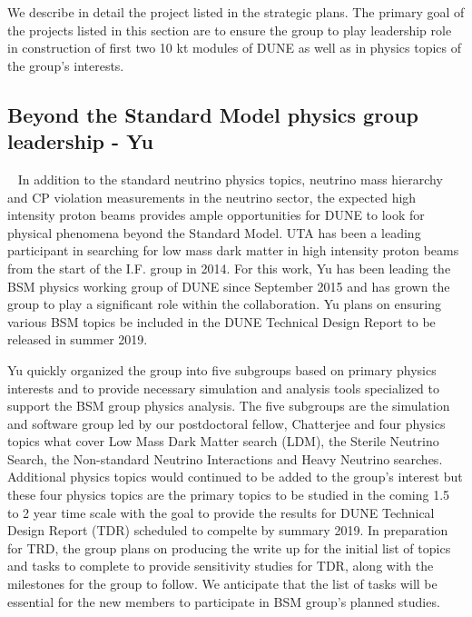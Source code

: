 \label{sec:IF_protoDUNE}
We describe in detail the project listed in the strategic plans.   The primary goal of the projects listed in this section are to ensure
the group to play leadership role in construction of first two 10 kt modules of DUNE as well as in physics topics of the group's 
interests.  
%
%
\subsection {Beyond the Standard Model physics group leadership - Yu}~\label{section:dune-bsm}
In addition to the standard neutrino physics topics, neutrino mass hierarchy and CP violation measurements in the neutrino sector, the 
expected high intensity proton beams provides ample opportunities for DUNE to look for physical phenomena beyond the Standard Model. UTA has been a leading participant in searching for low mass dark matter in high intensity proton beams from the start of the I.F. group in 2014. For this work, Yu has been leading the BSM physics working group of DUNE since September 2015 and has grown the group to play a significant role within the collaboration. Yu plans on ensuring various BSM topics be included in the DUNE Technical Design Report to be released in summer 2019.

Yu quickly organized the group into five subgroups based on primary physics interests and to provide necessary
simulation and analysis tools specialized to support the BSM group physics analysis.
The five subgroups are the simulation and software group led by our postdoctoral fellow, Chatterjee and four physics topics what cover
Low Mass Dark Matter search (LDM), the Sterile Neutrino Search, the Non-standard Neutrino Interactions and Heavy Neutrino searches.
Additional physics topics would continued to be added to the group's interest but these four physics topics are the primary topics to be
studied in the coming 1.5 to 2 year time scale with the goal to provide the results for DUNE Technical Design Report (TDR) scheduled to compelte
by summary 2019.
In preparation for TRD, the group plans on producing the write up for the initial list of topics and tasks to complete to provide
sensitivity studies for TDR, along with the milestones for the group to follow.
We anticipate that the list of tasks will be essential for the new members to participate in BSM group's planned studies.
%
%
